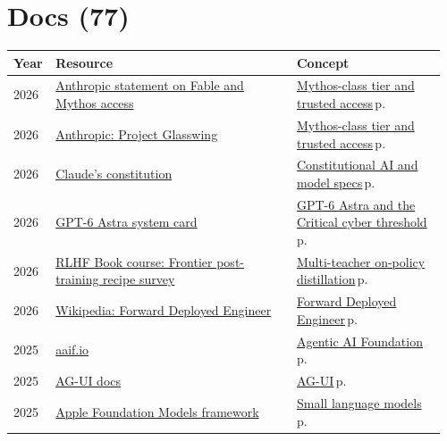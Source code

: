 \documentclass[10pt,a4paper,openany]{report}
\begin{document}
\section{Docs (77)}
{\small\begin{longtable}{@{}p{0.07\linewidth}>{\raggedright}p{0.55\linewidth}>{\raggedright\arraybackslash}p{0.34\linewidth}@{}}
\textbf{\sffamily Year} & \textbf{\sffamily Resource} & \textbf{\sffamily Concept}\\ \hline\endhead
2026 & \href{https://www.anthropic.com/news/fable-mythos-access}{Anthropic statement on Fable and Mythos access} & \hyperref[c:landscape-0]{Mythos-class tier and trusted access}\,{\color{muted}\scriptsize p.\,\pageref{c:landscape-0}}\\
2026 & \href{https://www.anthropic.com/glasswing}{Anthropic: Project Glasswing} & \hyperref[c:landscape-0]{Mythos-class tier and trusted access}\,{\color{muted}\scriptsize p.\,\pageref{c:landscape-0}}\\
2026 & \href{https://www.anthropic.com/constitution}{Claude's constitution} & \hyperref[c:reasoning-7]{Constitutional AI and model specs}\,{\color{muted}\scriptsize p.\,\pageref{c:reasoning-7}}\\
2026 & \href{https://deploymentsafety.openai.com/gpt-6-astra}{GPT-6 Astra system card} & \hyperref[c:landscape-1]{GPT-6 Astra and the Critical cyber threshold}\,{\color{muted}\scriptsize p.\,\pageref{c:landscape-1}}\\
2026 & \href{https://rlhfbook.com/teach/course/conversation-01/}{RLHF Book course: Frontier post-training recipe survey} & \hyperref[c:reasoning-3]{Multi-teacher on-policy distillation}\,{\color{muted}\scriptsize p.\,\pageref{c:reasoning-3}}\\
2026 & \href{https://en.wikipedia.org/wiki/Forward_Deployed_Engineer}{Wikipedia: Forward Deployed Engineer} & \hyperref[c:practice-0]{Forward Deployed Engineer}\,{\color{muted}\scriptsize p.\,\pageref{c:practice-0}}\\
2025 & \href{https://aaif.io}{aaif.io} & \hyperref[c:protocols-4]{Agentic AI Foundation}\,{\color{muted}\scriptsize p.\,\pageref{c:protocols-4}}\\
2025 & \href{https://docs.ag-ui.com}{AG-UI docs} & \hyperref[c:protocols-8]{AG-UI}\,{\color{muted}\scriptsize p.\,\pageref{c:protocols-8}}\\
2025 & \href{https://developer.apple.com/documentation/foundationmodels}{Apple Foundation Models framework} & \hyperref[c:arch-11]{Small language models}\,{\color{muted}\scriptsize p.\,\pageref{c:arch-11}}\\

\end{longtable}}
\end{document}
